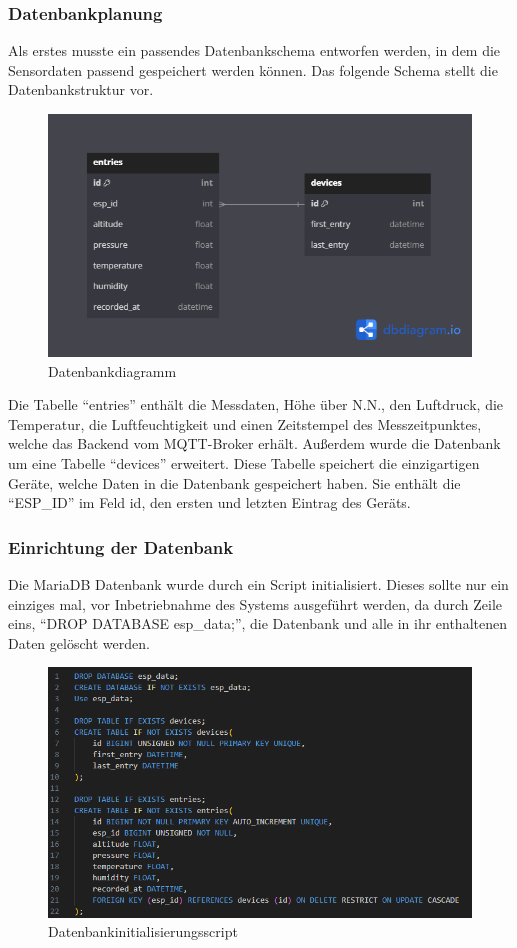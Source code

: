 \subsubsection{Datenbankplanung}
Als erstes musste ein passendes Datenbankschema entworfen werden, in dem die Sensordaten passend gespeichert werden können. Das folgende Schema stellt die Datenbankstruktur vor.
\begin{figure}[H]
	\centering
	\includegraphics[width=15cm]{images/db_diagram.png}
	\caption{Datenbankdiagramm}
	\label{fig:db_diagram}
\end{figure}
Die Tabelle "`entries"' enthält die Messdaten, Höhe über N.N., den Luftdruck, die Temperatur, die Luftfeuchtigkeit und einen Zeitstempel des Messzeitpunktes, welche das Backend vom MQTT-Broker erhält. Außerdem wurde die Datenbank um eine Tabelle "`devices"' erweitert. Diese Tabelle speichert die einzigartigen Geräte, welche Daten in die Datenbank gespeichert haben. Sie enthält die "`ESP\_ID"' im Feld id, den ersten und letzten Eintrag des Geräts.

\subsubsection{Einrichtung der Datenbank}
Die MariaDB Datenbank wurde durch ein Script initialisiert.  Dieses sollte nur ein einziges mal, vor Inbetriebnahme des Systems ausgeführt werden, da durch Zeile eins, "`DROP DATABASE esp\_data;"', die Datenbank und alle in ihr enthaltenen Daten gelöscht werden. 
\begin{figure}[H]
	\centering
	\includegraphics[width=15cm]{images/db_initialisation_script.png}
	\caption{Datenbankinitialisierungsscript}
	\label{fig:db_initialisation_script}
\end{figure}